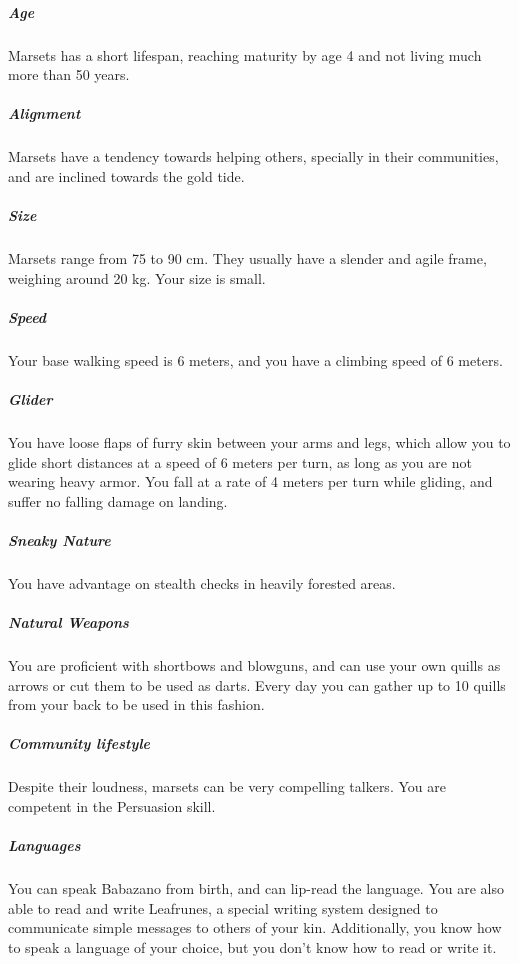     \subparagraph{Age} Marsets has a short lifespan, reaching maturity by age 4 and not living much more than 50 years.

    \subparagraph{Alignment} Marsets have a tendency towards helping others, specially in their communities, and are inclined towards the gold tide.

    \subparagraph{Size} Marsets range from 75 to 90 cm.
    They usually have a slender and agile frame, weighing around 20 kg.
    Your size is small.

    \subparagraph{Speed} Your base walking speed is 6 meters, and you have a climbing speed of 6 meters.

    \subparagraph{Glider} You have loose flaps of furry skin between your arms and legs, which allow you to glide short distances at a speed of 6 meters per turn, as long as you are not wearing heavy armor.
    You fall at a rate of 4 meters per turn while gliding, and suffer no falling damage on landing.

    \subparagraph{Sneaky Nature} You have advantage on stealth checks in heavily forested areas.

    \subparagraph{Natural Weapons} You are proficient with shortbows and blowguns, and can use your own quills as arrows or cut them to be used as darts.
    Every day you can gather up to 10 quills from your back to be used in this fashion.

    \subparagraph{Community lifestyle} Despite their loudness, marsets can be very compelling talkers.
    You are competent in the Persuasion skill.

    \subparagraph{Languages} You can speak Babazano from birth, and can lip-read the language.
    You are also able to read and write Leafrunes, a special writing system designed to communicate simple messages to others of your kin.
    Additionally, you know how to speak a language of your choice, but you don't know how to read or write it.


\newpage~\newpage

